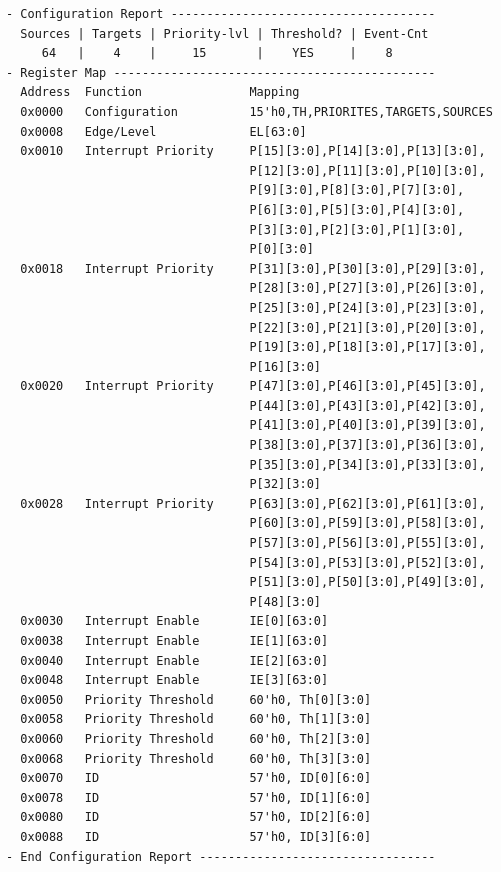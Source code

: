 \begin{verbatim}
- Configuration Report -------------------------------------
  Sources | Targets | Priority-lvl | Threshold? | Event-Cnt  
     64   |    4    |     15       |    YES     |    8       
- Register Map ---------------------------------------------
  Address  Function               Mapping
  0x0000   Configuration          15'h0,TH,PRIORITES,TARGETS,SOURCES
  0x0008   Edge/Level             EL[63:0]
  0x0010   Interrupt Priority     P[15][3:0],P[14][3:0],P[13][3:0],
                                  P[12][3:0],P[11][3:0],P[10][3:0],
                                  P[9][3:0],P[8][3:0],P[7][3:0],
                                  P[6][3:0],P[5][3:0],P[4][3:0],
                                  P[3][3:0],P[2][3:0],P[1][3:0],
                                  P[0][3:0]
  0x0018   Interrupt Priority     P[31][3:0],P[30][3:0],P[29][3:0],
                                  P[28][3:0],P[27][3:0],P[26][3:0],
                                  P[25][3:0],P[24][3:0],P[23][3:0],
                                  P[22][3:0],P[21][3:0],P[20][3:0],
                                  P[19][3:0],P[18][3:0],P[17][3:0],
                                  P[16][3:0]
  0x0020   Interrupt Priority     P[47][3:0],P[46][3:0],P[45][3:0],
                                  P[44][3:0],P[43][3:0],P[42][3:0],
                                  P[41][3:0],P[40][3:0],P[39][3:0],
                                  P[38][3:0],P[37][3:0],P[36][3:0],
                                  P[35][3:0],P[34][3:0],P[33][3:0],
                                  P[32][3:0]
  0x0028   Interrupt Priority     P[63][3:0],P[62][3:0],P[61][3:0],
                                  P[60][3:0],P[59][3:0],P[58][3:0],
                                  P[57][3:0],P[56][3:0],P[55][3:0],
                                  P[54][3:0],P[53][3:0],P[52][3:0],
                                  P[51][3:0],P[50][3:0],P[49][3:0],
                                  P[48][3:0]
  0x0030   Interrupt Enable       IE[0][63:0]
  0x0038   Interrupt Enable       IE[1][63:0]
  0x0040   Interrupt Enable       IE[2][63:0]
  0x0048   Interrupt Enable       IE[3][63:0]
  0x0050   Priority Threshold     60'h0, Th[0][3:0]
  0x0058   Priority Threshold     60'h0, Th[1][3:0]
  0x0060   Priority Threshold     60'h0, Th[2][3:0]
  0x0068   Priority Threshold     60'h0, Th[3][3:0]
  0x0070   ID                     57'h0, ID[0][6:0]
  0x0078   ID                     57'h0, ID[1][6:0]
  0x0080   ID                     57'h0, ID[2][6:0]
  0x0088   ID                     57'h0, ID[3][6:0]
- End Configuration Report ---------------------------------
\end{verbatim}




